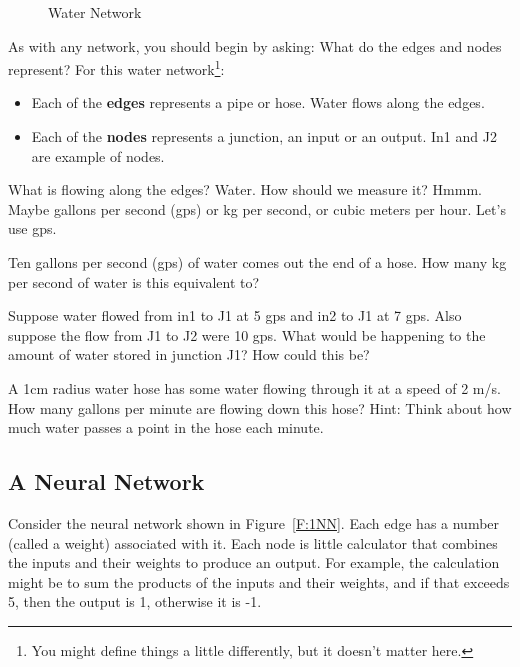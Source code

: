 \begin{figure}[H]
\begin{center}
\caption{Water Network}
\label{F:1WN}
\end{center}
\end{figure}

As with any network, you should begin by asking: What do the edges and nodes represent? For this water network\footnote{You might define things a little differently, but it doesn't matter here.}:
\begin{itemize}
\item Each of the \textbf{edges} represents a pipe or hose. Water flows along the edges.
\item Each of the \textbf{nodes} represents a junction, an input or an output. In1 and J2 are example of nodes.
\end{itemize}
What is flowing along the edges? Water.
How should we measure it? Hmmm. Maybe gallons per second (gps) or kg per second, or cubic meters per hour. Let's use gps.

\begin{blevel}
Ten gallons per second (gps) of water comes out the end of a hose. How many kg per second of water is this equivalent to?
\end{blevel}

\begin{blevel}
Suppose water flowed from in1 to J1 at 5 gps and in2 to J1 at 7 gps. Also suppose the flow from J1 to J2 were 10 gps. What would be happening to the amount of water stored in junction J1? How could this be?
\end{blevel}

\begin{clevel}
A 1cm radius water hose has some water flowing through it at a speed of 2 m/s. How many gallons per minute are flowing down this hose? Hint: Think about how much water passes a point in the hose each minute.
\end{clevel}

\subsection{A Neural Network}
Consider the neural network shown in Figure~\ref{F:1NN}. Each edge has a number (called a weight) associated with it. Each node is little calculator that combines the inputs and their weights to produce an output. For example, the calculation might be to sum the products of the inputs and their weights, and if that exceeds 5, then the output is 1, otherwise it is -1. 

